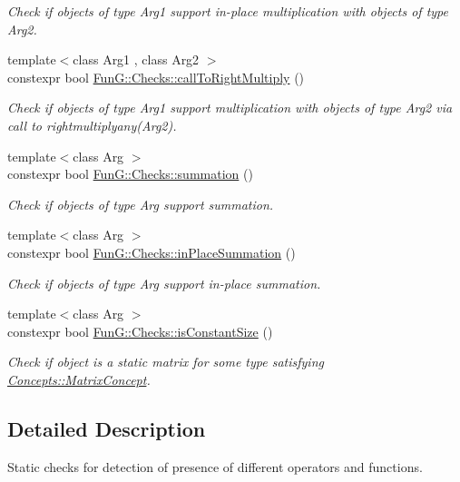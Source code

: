 \begin{DoxyCompactItemize}
\begin{DoxyCompactList}\small\item\em Check if objects of type Arg1 support in-\/place multiplication with objects of type Arg2. \end{DoxyCompactList}\item 
{\footnotesize template$<$class Arg1 , class Arg2 $>$ }\\constexpr bool \hyperlink{namespaceFunG_1_1Checks_a3874c9f52b64baa8ed9a87b9902eb54c}{Fun\+G\+::\+Checks\+::call\+To\+Right\+Multiply} ()
\begin{DoxyCompactList}\small\item\em Check if objects of type Arg1 support multiplication with objects of type Arg2 via call to rightmultiplyany(\+Arg2). \end{DoxyCompactList}\item 
{\footnotesize template$<$class Arg $>$ }\\constexpr bool \hyperlink{namespaceFunG_1_1Checks_a2dd2bf4016317339c1a609ddda1f4915}{Fun\+G\+::\+Checks\+::summation} ()
\begin{DoxyCompactList}\small\item\em Check if objects of type Arg support summation. \end{DoxyCompactList}\item 
{\footnotesize template$<$class Arg $>$ }\\constexpr bool \hyperlink{namespaceFunG_1_1Checks_a9ff694f025cc9f2ff379b1f3833641bb}{Fun\+G\+::\+Checks\+::in\+Place\+Summation} ()
\begin{DoxyCompactList}\small\item\em Check if objects of type Arg support in-\/place summation. \end{DoxyCompactList}\item 
{\footnotesize template$<$class Arg $>$ }\\constexpr bool \hyperlink{namespaceFunG_1_1Checks_adcc3e179af2ed0384a3773ea086045b9}{Fun\+G\+::\+Checks\+::is\+Constant\+Size} ()
\begin{DoxyCompactList}\small\item\em Check if object is a static matrix for some type satisfying \hyperlink{structFunG_1_1Concepts_1_1MatrixConcept}{Concepts\+::\+Matrix\+Concept}. \end{DoxyCompactList}\end{DoxyCompactItemize}


\subsection{Detailed Description}
Static checks for detection of presence of different operators and functions. 

